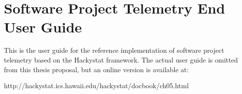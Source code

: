 \chapter{Software Project Telemetry End User Guide}
\label{Chapter:TelemetryUserGuide}



This is the user guide for the reference implementation of software project telemetry based on the Hackystat framework. The actual user guide is omitted from this thesis proposal, but an online version is available at:

http://hackystat.ics.hawaii.edu/hackystat/docbook/ch05.html 
